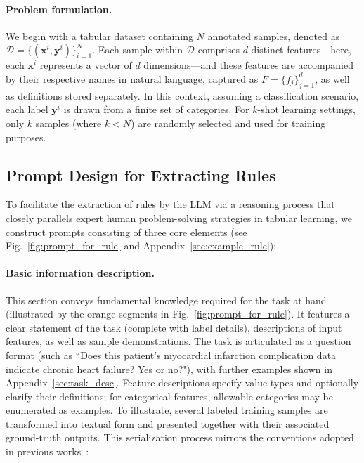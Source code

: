 \vspace*{-0.12in}
\paragraph{Problem formulation.} We begin with a tabular dataset containing $N$ annotated samples, denoted as $\mathcal{D} = \{(\mathbf{x}^i, \mathbf{y}^i)\}_{i=1}^{N}$. Each sample within $\mathcal{D}$ comprises $d$ distinct features—here, each $\mathbf{x}^i$ represents a vector of $d$ dimensions—and these features are accompanied by their respective names in natural language, captured as $F = \{f_j\}_{j=1}^{d}$, as well as definitions stored separately. In this context, assuming a classification scenario, each label $\mathbf{y}^i$ is drawn from a finite set of categories. For $k$-shot learning settings, only $k$ samples (where $k<N$) are randomly selected and used for training purposes.

\subsection{Prompt Design for Extracting Rules}
\label{Sec:prompt_design}
To facilitate the extraction of rules by the LLM via a reasoning process that closely parallels expert human problem-solving strategies in tabular learning, we construct prompts consisting of three core elements (see Fig.~\ref{fig:prompt_for_rule} and Appendix~\ref{sec:example_rule}):

\vspace*{-0.12in}
\paragraph{Basic information description.} This section conveys fundamental knowledge required for the task at hand (illustrated by the orange segments in Fig.~\ref{fig:prompt_for_rule}). It features a clear statement of the task (complete with label details), descriptions of input features, as well as sample demonstrations. The task is articulated as a question format (such as ``Does this patient's myocardial infarction complication data indicate chronic heart failure? Yes or no?"), with further examples shown in Appendix~\ref{sec:task_desc}. Feature descriptions specify value types and optionally clarify their definitions; for categorical features, allowable categories may be enumerated as examples. To illustrate, several labeled training samples are transformed into textual form and presented together with their associated ground-truth outputs. This serialization process mirrors the conventions adopted in previous works~\cite{dinh2022lift,hegselmann2023tabllm}:

